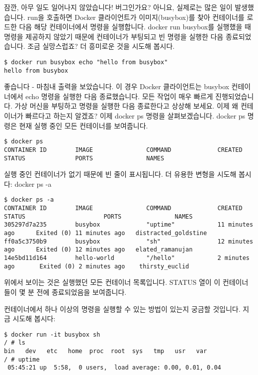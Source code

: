 잠깐, 아무 일도 일어나지 않았습니다! 버그인가요? 아니요, 실제로는 많은 일이 발생했습니다. run을 호출하면 Docker 클라이언트가 이미지(busybox)를 찾아 컨테이너를 로드한 다음 해당 컨테이너에서 명령을 실행합니다. docker run busybox를 실행했을 때 명령을 제공하지 않았기 때문에 컨테이너가 부팅되고 빈 명령을 실행한 다음 종료되었습니다. 조금 실망스럽죠? 더 흥미로운 것을 시도해 봅시다.
\begin{lstlisting}[language=Shell]
$ docker run busybox echo "hello from busybox"
hello from busybox
\end{lstlisting}

좋습니다 - 마침내 출력을 보았습니다. 이 경우 Docker 클라이언트는 busybox 컨테이너에서 echo 명령을 실행한 다음 종료했습니다. 모든 작업이 매우 빠르게 진행되었습니다. 가상 머신을 부팅하고 명령을 실행한 다음 종료한다고 상상해 보세요. 이제 왜 컨테이너가 빠르다고 하는지 알겠죠? 이제 docker ps 명령을 살펴보겠습니다. docker ps 명령은 현재 실행 중인 모든 컨테이너를 보여줍니다.
\begin{lstlisting}[language=Shell]
$ docker ps
CONTAINER ID        IMAGE               COMMAND             CREATED             STATUS              PORTS               NAMES
\end{lstlisting}

실행 중인 컨테이너가 없기 때문에 빈 줄이 표시됩니다. 더 유용한 변형을 시도해 봅시다: docker ps -a
\begin{lstlisting}[language=Shell]
$ docker ps -a
CONTAINER ID        IMAGE               COMMAND             CREATED             STATUS                      PORTS               NAMES
305297d7a235        busybox             "uptime"            11 minutes ago      Exited (0) 11 minutes ago   distracted_goldstine
ff0a5c3750b9        busybox             "sh"                12 minutes ago      Exited (0) 12 minutes ago   elated_ramanujan
14e5bd11d164        hello-world         "/hello"            2 minutes ago       Exited (0) 2 minutes ago    thirsty_euclid
\end{lstlisting}

위에서 보이는 것은 실행했던 모든 컨테이너 목록입니다. STATUS 열이 이 컨테이너들이 몇 분 전에 종료되었음을 보여줍니다.

컨테이너에서 하나 이상의 명령을 실행할 수 있는 방법이 있는지 궁금할 것입니다. 지금 시도해 봅시다:
\begin{lstlisting}[language=Shell]
$ docker run -it busybox sh
/ # ls
bin   dev   etc   home  proc  root  sys   tmp   usr   var
/ # uptime
 05:45:21 up  5:58,  0 users,  load average: 0.00, 0.01, 0.04
\end{lstlisting}

